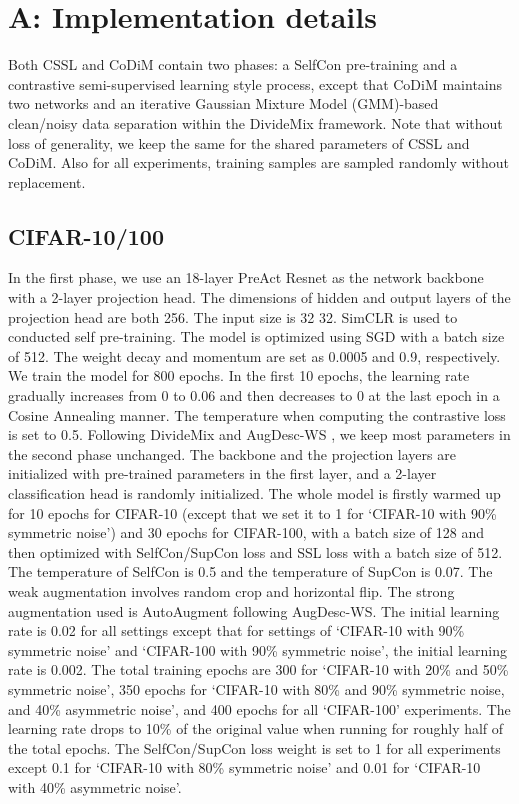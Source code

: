\documentclass[letterpaper]{article} \usepackage{aaai22}  \usepackage{times}  \usepackage{helvet}  \usepackage{courier}  \usepackage[hyphens]{url}  \usepackage{graphicx} \usepackage{subfigure}
\begin{document}
\clearpage


\clearpage
\appendix
\section{A: Implementation details}
Both CSSL and CoDiM contain two phases: a SelfCon pre-training and a contrastive semi-supervised learning style process, except that CoDiM maintains two networks and an iterative Gaussian Mixture Model (GMM)-based clean/noisy data separation within the DivideMix framework. Note that without loss of generality, we keep the same for the shared parameters of CSSL and CoDiM. Also for all experiments, training samples are sampled randomly without replacement.
\subsection{CIFAR-10/100}
In the first phase, we use an 18-layer PreAct Resnet as the network backbone with a 2-layer projection head. The dimensions of hidden and output layers of the projection head are both 256. The input size is 32  32. SimCLR is used to conducted self pre-training. The model is optimized using SGD with a batch size of 512. The weight decay and momentum are set as 0.0005 and 0.9, respectively. We train the model for 800 epochs. In the first 10 epochs, the learning rate gradually increases from 0 to 0.06 and then decreases to 0 at the last epoch in a Cosine Annealing manner. The temperature  when computing the contrastive loss is set to 0.5. Following DivideMix \cite{li2020dividemix} and AugDesc-WS \cite{nishi2021augmentation}, we keep most parameters in the second phase unchanged. The backbone and the projection layers are initialized with pre-trained parameters in the first layer, and a 2-layer classification head is randomly initialized. The whole model is firstly warmed up for 10 epochs for CIFAR-10 (except that we set it to 1 for `CIFAR-10 with 90\% symmetric noise') and 30 epochs for CIFAR-100, with a batch size of 128 and then optimized with SelfCon/SupCon loss and SSL loss with a batch size of 512. The temperature  of SelfCon is 0.5 and the temperature  of SupCon is 0.07. The weak augmentation involves random crop and horizontal flip. The strong augmentation used is AutoAugment following AugDesc-WS. The initial learning rate is 0.02 for all settings except that for settings of `CIFAR-10 with 90\% symmetric noise' and `CIFAR-100 with 90\% symmetric noise', the initial learning rate is 0.002. The total training epochs are 300 for `CIFAR-10 with 20\% and 50\% symmetric noise', 350 epochs for `CIFAR-10 with 80\% and 90\% symmetric noise, and 40\% asymmetric noise', and 400 epochs for all `CIFAR-100' experiments. The learning rate drops to 10\% of the original value when running for roughly half of the total epochs. The SelfCon/SupCon loss weight is set to 1 for all experiments except 0.1 for `CIFAR-10 with 80\% symmetric noise' and 0.01 for `CIFAR-10 with 40\% asymmetric noise'.
\end{document}
